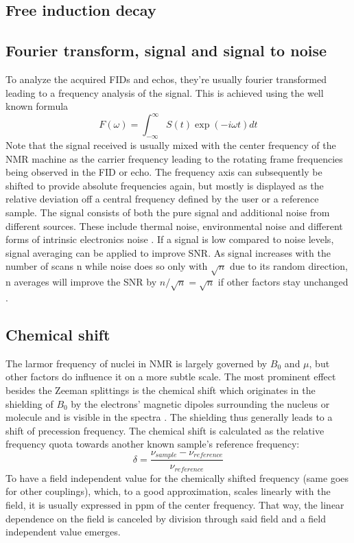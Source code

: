         \subsection{Free induction decay}
        \subsection{Fourier transform, signal and signal to noise}
        \label{chapter:theory:fourierTransform}
        To analyze the acquired FIDs and echos, they're usually fourier transformed leading to a frequency analysis of the signal. This is achieved using the well known formula \cite{farrar_pulse_2012}
            \begin{equation}
                F(\omega) = \int^{\infty}_{-\infty}S(t) \exp(-i\omega t)dt
            \end{equation}
            Note that the signal received is usually mixed with the center frequency of the NMR machine as the carrier frequency leading to the rotating frame frequencies being observed in the FID or echo. The frequency axis can subsequently be shifted to provide absolute frequencies again, but mostly is displayed as the relative deviation off a central frequency defined by the user or a reference sample.
            The signal consists of both the pure signal and additional noise from different sources. These include thermal noise, environmental noise and different forms of intrinsic electronics noise \cite{noauthor_henry_nodate}.
            If a signal is low compared to noise levels, signal averaging can be applied to improve SNR. As signal increases with the number of scans n while noise does so only with $\sqrt n$ due to its random direction, n averages will improve the SNR by $n/\sqrt{n} = \sqrt{n}$ if other factors stay unchanged \cite{edelstein_intrinsic_1986}. 
        \subsection{Chemical shift}
            The larmor frequency of nuclei in NMR is largely governed by $B_0$ and $\mu$, but other factors do influence it on a more subtle scale. The most prominent effect besides the Zeeman splittings is the chemical shift which originates in the shielding of $B_0$ by the electrons' magnetic dipoles surrounding the nucleus or molecule and is visible in the spectra \cite{gottlieb_nmr_1997}. The shielding thus generally leads to a shift of precession frequency. The chemical shift is calculated as the relative frequency quota towards another known sample's reference frequency:
            \begin{equation}
                \delta = \frac{\nu_{sample} - \nu_{reference}}{\nu_{reference}}
            \end{equation}
            To have a field independent value for the chemically shifted frequency (same goes for other couplings), which, to a good approximation, scales linearly with the field, it is usually expressed in ppm of the center frequency. That way, the linear dependence on the field is canceled by division through said field and a field independent value emerges.
